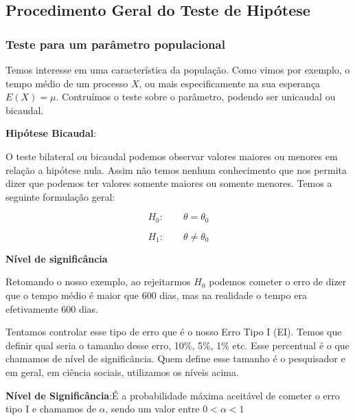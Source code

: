 \documentclass[
  letterpaper,
  DIV=11,
  numbers=noendperiod]{scrreprt}
\begin{document}
\subsection{Procedimento Geral do Teste de
Hipótese}\label{procedimento-geral-do-teste-de-hipuxf3tese}

\subsubsection{Teste para um parâmetro
populacional}\label{teste-para-um-paruxe2metro-populacional}

Temos interesse em uma característica da população. Como vimos por
exemplo, o tempo médio de um processo \(X\), ou mais especificamente na
sua esperança \(E(X)=\mu\). Contruímos o teste sobre o parâmetro,
podendo ser unicaudal ou bicaudal.

\textbf{Hipótese Bicaudal}:

O teste bilateral ou bicaudal podemos observar valores maiores ou
menores em relação a hipótese nula. Assim não temos nenhum conhecimento
que nos permita dizer que podemos ter valores somente maiores ou somente
menores. Temos a seguinte formulação geral:

\[H_0: \qquad \theta=\theta_0\]

\[H_1: \qquad \theta \neq \theta_0\]

\textbf{Nível de significância}

Retomando o nosso exemplo, ao rejeitarmos \(H_0\) podemos cometer o erro
de dizer que o tempo médio é maior que 600 dias, mas na realidade o
tempo era efetivamente 600 dias.

Tentamos controlar esse tipo de erro que é o nosso Erro Tipo I (EI).
Temos que definir qual seria o tamanho desse erro, 10\%, 5\%, 1\% etc.
Esse percentual é o que chamamos de nível de significância. Quem define
esse tamanho é o pesquisador e em geral, em ciência sociais, utilizamos
os níveis acima.

\begin{tcolorbox}[enhanced jigsaw, leftrule=.75mm, coltitle=black, colframe=quarto-callout-note-color-frame, toprule=.15mm, opacitybacktitle=0.6, bottomtitle=1mm, bottomrule=.15mm, titlerule=0mm, toptitle=1mm, title=\textcolor{quarto-callout-note-color}{\faInfo}\hspace{0.5em}{Nível de Signficãncia}, arc=.35mm, breakable, opacityback=0, colbacktitle=quarto-callout-note-color!10!white, colback=white, left=2mm, rightrule=.15mm]

\textbf{Nível de Significância}:É a probabilidade máxima aceitável de
cometer o erro tipo I e chamamos de \(\alpha\), sendo um valor entre
\(0<\alpha<1\)

\end{tcolorbox}
\end{document}
